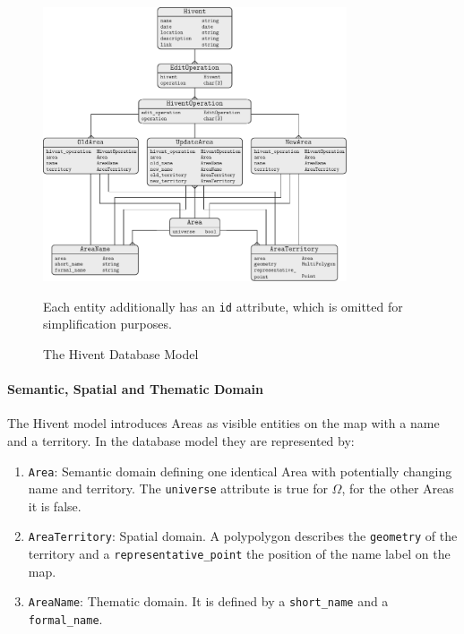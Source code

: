 \begin{figure}[ht]
  \centering
  \includegraphics[width=0.8\textwidth]{graphics/development/implementation/database_model}
  \caption{The Hivent Database Model}
  \small{Each entity additionally has an \texttt{id} attribute, which is omitted for simplification purposes.}
  \label{fig:database_model_er}
\end{figure}

\paragraph{Semantic, Spatial and Thematic Domain} %
\label{par:semantic_spatial_and_thematic_domain}

The Hivent model introduces Areas as visible entities on the map with a name and a territory. In the database model they are represented by:

\begin{enumerate}
  \item \texttt{Area}: Semantic domain defining one identical Area with potentially changing name and territory. The \texttt{universe} attribute is true for $\Omega$, for the other Areas it is false.
  \item \texttt{AreaTerritory}: Spatial domain. A polypolygon describes the \texttt{geometry} of the territory and a \texttt{representative\_point} the position of the name label on the map.
  \item \texttt{AreaName}: Thematic domain. It is defined by a \texttt{short\_name} and a \texttt{formal\_name}.
\end{enumerate}

